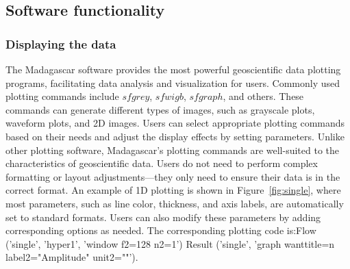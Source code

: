 \subsection{Software functionality}
\subsubsection{Displaying the data}
The Madagascar software provides the most powerful geoscientific data plotting programs, facilitating data analysis and visualization for users. Commonly used plotting commands include $sfgrey$, $sfwigb$, $sfgraph$, and others. These commands can generate different types of images, such as grayscale plots, waveform plots, and 2D images. Users can select appropriate plotting commands based on their needs and adjust the display effects by setting parameters. Unlike other plotting software, Madagascar's plotting commands are well-suited to the characteristics of geoscientific data. Users do not need to perform complex formatting or layout adjustments—they only need to ensure their data is in the correct format. An example of 1D plotting is shown in Figure~\ref{fig:single}, where most parameters, such as line color, thickness, and axis labels, are automatically set to standard formats. Users can also modify these parameters by adding corresponding options as needed.
{The corresponding plotting code is:Flow ('single', 'hyper1', 'window f2=128 n2=1')
Result ('single', 'graph wanttitle=n label2="Amplitude" unit2=""').}

